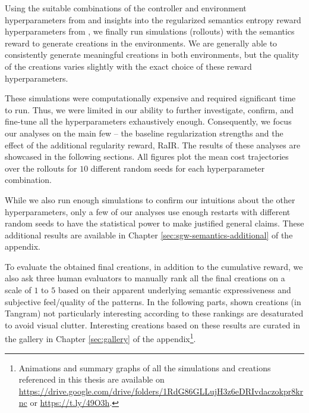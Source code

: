 Using the suitable combinations of the controller and environment hyperparameters from  and insights into the regularized semantics entropy reward hyperparameters from , we finally run simulations (rollouts) with the semantics reward to generate creations in the environments.
We are generally able to consistently generate meaningful creations in both environments, but the quality of the creations varies slightly with the exact choice of these reward hyperparameters.

These simulations were computationally expensive and required significant time to run.
Thus, we were limited in our ability to further investigate, confirm, and fine-tune all the hyperparameters exhaustively enough. 
Consequently, we focus our analyses on the main few -- the baseline regularization strengths and the effect of the additional regularity reward, RaIR.
The results of these analyses are showcased in the following sections.
All figures plot the mean cost trajectories over the rollouts for \(10\) different random seeds for each hyperparameter combination.

While we also run enough simulations to confirm our intuitions about the other hyperparameters, only a few of our analyses use enough restarts with different random seeds to have the statistical power to make justified general claims.
These additional results are available in Chapter \ref{sec:sgw-semantics-additional} of the appendix.

To evaluate the obtained final creations, in addition to the cumulative reward, we also ask three human evaluators to manually rank all the final creations on a scale of \(1\) to \(5\) based on their apparent underlying semantic expressiveness and subjective feel/quality of the patterns.
In the following parts, shown creations (in Tangram) not particularly interesting according to these rankings are desaturated to avoid visual clutter.
Interesting creations based on these results are curated in the gallery in Chapter \ref{sec:gallery} of the appendix\footnote[1]{Animations and summary graphs of all the simulations and creations referenced in this thesis are available on \url{https://drive.google.com/drive/folders/1RdG86GLLujH3z6eDRIvdaczokpr8krnc} or \url{https://t.ly/49O3h}.}.



